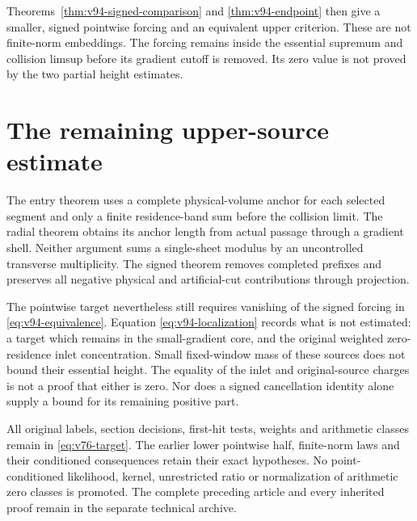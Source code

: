 \documentclass[11pt,reqno]{amsart}
\numberwithin{equation}{section}
\theoremstyle{definition}
\theoremstyle{remark}\newtheorem{remark}[theorem]{Remark}
\begin{document}
Theorems~\ref{thm:v94-signed-comparison} and \ref{thm:v94-endpoint}
then give a smaller, signed pointwise forcing and an equivalent upper
criterion. These are not finite-norm embeddings. The forcing remains
inside the essential supremum and collision limsup before its gradient
cutoff is removed. Its zero value is not proved by the two partial
height estimates.






\section{The remaining upper-source estimate}
The entry theorem uses a complete physical-volume anchor for each
selected segment and only a finite residence-band sum before the
collision limit. The radial theorem obtains its anchor length from
actual passage through a gradient shell. Neither argument sums a
single-sheet modulus by an uncontrolled transverse multiplicity.
The signed theorem removes completed prefixes and preserves all
negative physical and artificial-cut contributions through projection.

The pointwise target nevertheless still requires vanishing of the
signed forcing in \eqref{eq:v94-equivalence}. Equation
\eqref{eq:v94-localization} records what is not estimated: a target
which remains in the small-gradient core, and the original weighted
zero-residence inlet concentration. Small fixed-window mass of these
sources does not bound their essential height. The equality of the
inlet and original-source charges is not a proof that either is zero.
Nor does a signed cancellation identity alone supply a bound for its
remaining positive part.

All original labels, section decisions, first-hit tests, weights and
arithmetic classes remain in \eqref{eq:v76-target}. The earlier lower
pointwise half, finite-norm laws and their conditioned consequences
retain their exact hypotheses. No point-conditioned likelihood, kernel,
unrestricted ratio or normalization of arithmetic zero classes is
promoted. The complete preceding article and every inherited proof
remain in the separate technical archive.

\appendix


\end{document}
